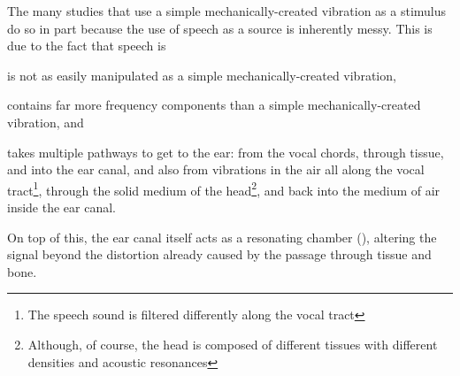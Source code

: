 The many studies that use a simple mechanically-created vibration as a stimulus do so in part because the use of speech as a source is inherently messy.  This is due to the fact that speech is 
\begin{enumerate*}[label={\alph*)}]
  \item  is not as easily manipulated as a simple mechanically-created vibration,
  \item  contains far more frequency components than a simple mechanically-created vibration, and 
  \item  takes multiple pathways to get to the ear: from the vocal chords, through tissue, and into the ear canal, and also from vibrations in the air all along the vocal tract\footnote{The speech sound is \DIFdelbegin {}\DIFdelend filtered differently \DIFdelbegin {}\DIFdelend \DIFaddbegin {}\DIFaddend along the vocal tract}, through the solid medium of the head\footnote{Although, of course, the head is composed of different tissues with different densities and acoustic resonances}, and back into the medium of air inside the ear canal.
\end{enumerate*}
% 
\DIFdelbegin %
{%
}
\DIFdelend %
%
On top of this, the ear canal itself acts as a resonating chamber (\cite{rosen:91}), altering the signal beyond the distortion already caused by the passage through tissue and bone.  


